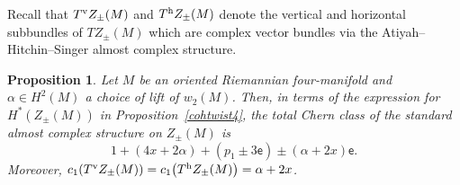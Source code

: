 \documentclass[pdftex]{sigma}%
\numberwithin{equation}{section}
\newtheorem{Proposition}[Theorem]{Proposition}
 { \theoremstyle{definition}
\newtheorem{Definition}[Theorem]{Definition}
\newtheorem{Note}[Theorem]{Note}
\newtheorem{Example}[Theorem]{Example}
\newtheorem{Remark}[Theorem]{Remark} }
\begin{document}
Recall that $T^{\rm v} Z_{\pm}(M)$ and $T^{\rm h}Z_{\pm}(M)$ denote the vertical and horizontal subbundles of \linebreak $TZ_{\pm}(M)$ which are complex vector bundles via the Atiyah--Hitchin--Singer almost complex structure.

\begin{Proposition}\label{chernclasses}
Let $M$ be an oriented Riemannian four-manifold and $\alpha \in H^2(M)$ a choice of lift of $w_2(M)$. Then, in terms of the expression for $H^*(Z_\pm(M))$ in Proposition~{\rm \ref{cohtwist4}}, the total Chern class of the standard almost complex structure on $Z_\pm(M)$ is
\begin{equation}
\label{chernform}
1 + (4x+2\alpha) + (p_1 \pm 3\mathsf{e}) \pm (\alpha + 2x)\mathsf{e}.
\end{equation}
Moreover, $c_1(T^{\rm v}Z_\pm(M))=c_1\big(T^{\rm h}Z_\pm(M)\big)=\alpha + 2x$.
\end{Proposition}
\end{document}
